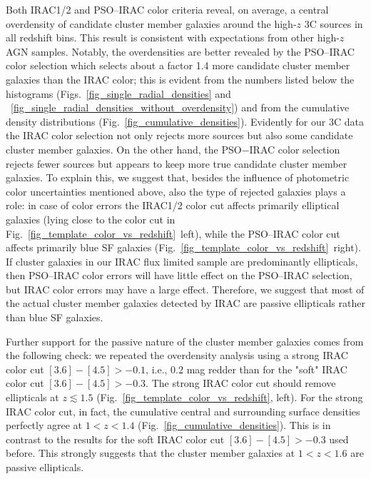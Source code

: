 \documentclass[mathleft,fleqn,%
]{an}
\begin{document}
Both IRAC1/2 and 
PSO--IRAC  color criteria reveal, on average, a central overdensity of candidate cluster member
galaxies around the high-$z$ 3C sources in all redshift bins. 
This result is consistent with expectations from other high-$z$ AGN
samples.
Notably, the overdensities are better revealed by the
PSO--IRAC color selection which 
selects about a factor 1.4 more candidate
cluster member galaxies
than the IRAC color; this is evident from the
numbers listed below the histograms 
(Figs.~\ref{fig_single_radial_densities} and
~\ref{fig_single_radial_densities_without_overdensity}) and from the cumulative
density distributions (Fig.~\ref{fig_cumulative_densities}).
Evidently for our 3C data the IRAC color
selection not only rejects more sources but 
also some candidate cluster member galaxies. 
On the other hand,  the PSO$-$IRAC color selection rejects
fewer sources but appears to keep more true candidate cluster member
galaxies. To explain this, we
suggest that, besides the influence
of photometric color %
uncertainties mentioned above, 
also the type of rejected galaxies plays a
role: in case of color errors the IRAC1/2 color cut affects primarily
elliptical galaxies (lying close to the color cut in 
Fig.~\ref{fig_template_color_vs_redshift}~left), 
while the PSO--IRAC color cut affects primarily blue SF
galaxies (Fig.~\ref{fig_template_color_vs_redshift}~right). 
If 
cluster galaxies 
in our IRAC flux
limited sample are predominantly ellipticals, 
then  PSO--IRAC color errors will have little effect on the
PSO--IRAC 
selection, but IRAC color errors may have a large effect.
Therefore, we suggest that 
most of the actual cluster member galaxies detected by IRAC are
passive ellipticals rather than blue SF galaxies.

Further support for the passive nature of the cluster member galaxies
comes from the following check: we repeated the overdensity analysis
using a strong IRAC color cut  $[3.6] - [4.5] > -0.1$, i.e., 0.2 mag
redder than for the "soft"  
IRAC color cut  $[3.6] - [4.5] > -0.3$.
The strong IRAC color cut should remove
 ellipticals at $z \lesssim 1.5$
(Fig.~\ref{fig_template_color_vs_redshift}, left).
For the strong IRAC color cut, in fact, 
the cumulative central and surrounding surface densities perfectly
agree at  $1<z<1.4$ (Fig.~\ref{fig_cumulative_densities}). 
This is in contrast to the results for the soft  
IRAC color cut  $[3.6] - [4.5] > -0.3$ used before. 
This strongly suggests that the cluster member galaxies at $1<z<1.6$ are
passive ellipticals. 
\end{document}
